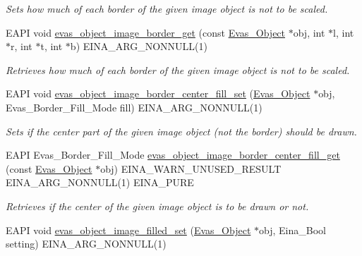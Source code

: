 \begin{DoxyCompactItemize}
\begin{DoxyCompactList}\small\item\em Sets how much of each border of the given image object is not to be scaled. \item\end{DoxyCompactList}\item 
EAPI void \hyperlink{group__Evas__Object__Image_gab666a37cbae8ee846cdeb518e7fd495c}{evas\_\-object\_\-image\_\-border\_\-get} (const \hyperlink{group__Evas__Object__Group_ga9e19e6dd1f517a0ba437c0114d3e7c97}{Evas\_\-Object} $\ast$obj, int $\ast$l, int $\ast$r, int $\ast$t, int $\ast$b) EINA\_\-ARG\_\-NONNULL(1)
\begin{DoxyCompactList}\small\item\em Retrieves how much of each border of the given image object is not to be scaled. \item\end{DoxyCompactList}\item 
EAPI void \hyperlink{group__Evas__Object__Image_ga4caf736585ad602e6748e434ac1f5fc6}{evas\_\-object\_\-image\_\-border\_\-center\_\-fill\_\-set} (\hyperlink{group__Evas__Object__Group_ga9e19e6dd1f517a0ba437c0114d3e7c97}{Evas\_\-Object} $\ast$obj, Evas\_\-Border\_\-Fill\_\-Mode fill) EINA\_\-ARG\_\-NONNULL(1)
\begin{DoxyCompactList}\small\item\em Sets if the center part of the given image object (not the border) should be drawn. \item\end{DoxyCompactList}\item 
EAPI Evas\_\-Border\_\-Fill\_\-Mode \hyperlink{group__Evas__Object__Image_ga04f8a4f69c5ad37d9229e4c39bb7c010}{evas\_\-object\_\-image\_\-border\_\-center\_\-fill\_\-get} (const \hyperlink{group__Evas__Object__Group_ga9e19e6dd1f517a0ba437c0114d3e7c97}{Evas\_\-Object} $\ast$obj) EINA\_\-WARN\_\-UNUSED\_\-RESULT EINA\_\-ARG\_\-NONNULL(1) EINA\_\-PURE
\begin{DoxyCompactList}\small\item\em Retrieves if the center of the given image object is to be drawn or not. \item\end{DoxyCompactList}\item 
EAPI void \hyperlink{group__Evas__Object__Image_gae304964ee6769e559ca452c788f5aae4}{evas\_\-object\_\-image\_\-filled\_\-set} (\hyperlink{group__Evas__Object__Group_ga9e19e6dd1f517a0ba437c0114d3e7c97}{Evas\_\-Object} $\ast$obj, Eina\_\-Bool setting) EINA\_\-ARG\_\-NONNULL(1)

\end{DoxyCompactItemize}
